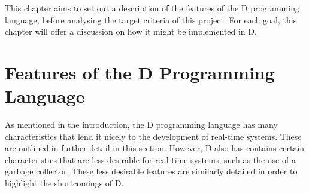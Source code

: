 
This chapter aims to set out a description of the features of the D
programming language, before analysing the target criteria of this project.
For each goal, this chapter will offer a discussion on how it might be 
implemented in D.

\section{Features of the D Programming Language}
As mentioned in the introduction, the D programming language has many 
characteristics that lend it nicely to the development of real-time systems.
These are outlined in further detail in this section. 
However, D also has contains certain characteristics that are less desirable for 
real-time systems, such as the use of a garbage collector. 
These less desirable features are similarly detailed in order to highlight the 
shortcomings of D. 

